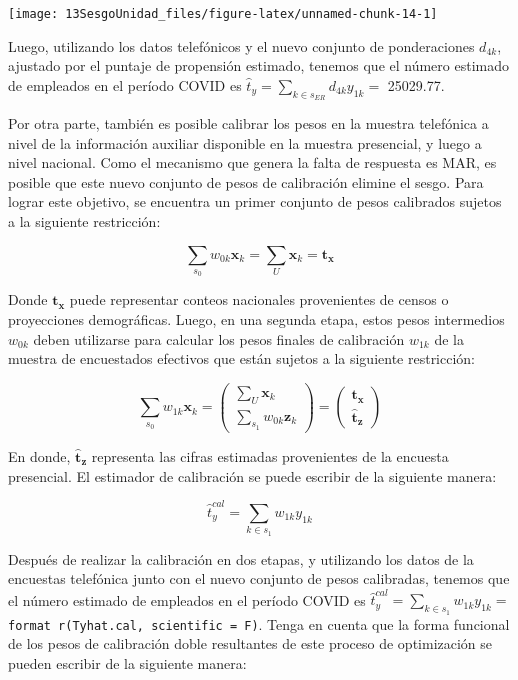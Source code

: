 \documentclass[
  12pt,
]{book}
\begin{document}
\begin{center}\texttt{[image: 13SesgoUnidad\_files/figure-latex/unnamed-chunk-14-1]} \end{center}

Luego, utilizando los datos telefónicos y el nuevo conjunto de ponderaciones \(d_{4k}\), ajustado por el puntaje de propensión estimado, tenemos que el número estimado de empleados en el período COVID es \(\hat{t}_y=\sum_{k\in s_{ER}}d_{4k}y_{1k} =\) 25029.77.

Por otra parte, también es posible calibrar los pesos en la muestra telefónica a nivel de la información auxiliar disponible en la muestra presencial, y luego a nivel nacional. Como el mecanismo que genera la falta de respuesta es MAR, es posible que este nuevo conjunto de pesos de calibración elimine el sesgo. Para lograr este objetivo, se encuentra un primer conjunto de pesos calibrados sujetos a la siguiente restricción:

\[
\sum_{s_0}w_{0k}\boldsymbol{x}_{k} = \sum_{U}\boldsymbol{x}_{k} = \mathbf{t_x}
\]

Donde \(\mathbf{t_x}\) puede representar conteos nacionales provenientes de censos o proyecciones demográficas. Luego, en una segunda etapa, estos pesos intermedios \(w_{0k}\) deben utilizarse para calcular los pesos finales de calibración \(w_{1k}\) de la muestra de encuestados efectivos que están sujetos a la siguiente restricción:

\[
\sum_{s_0}w_{1k}\boldsymbol{x}_{k} =
\begin{pmatrix}
\sum_{U}\boldsymbol{x}_{k}\\
\sum_{s_1}w_{0k}\boldsymbol{z}_{k} 
\end{pmatrix} =
\begin{pmatrix}
\mathbf{t_x}\\
\hat{\mathbf{t}}_\mathbf{z}
\end{pmatrix}
\]

En donde, \(\hat{\mathbf{t}}_\mathbf{z}\) representa las cifras estimadas provenientes de la encuesta presencial. El estimador de calibración se puede escribir de la siguiente manera:

\[
\hat{t}_y^{cal}=\sum_{k\in s_1}w_{1k}y_{1k}
\]

Después de realizar la calibración en dos etapas, y utilizando los datos de la encuestas telefónica junto con el nuevo conjunto de pesos calibradas, tenemos que el número estimado de empleados en el período COVID es \(\hat{t}_y^{cal}=\sum_{k\in s_1}w_{1k}y_{1k}=\) \texttt{format\ r(Tyhat.cal,\ scientific\ =\ F)}. Tenga en cuenta que la forma funcional de los pesos de calibración doble resultantes de este proceso de optimización se pueden escribir de la siguiente manera:
\end{document}
